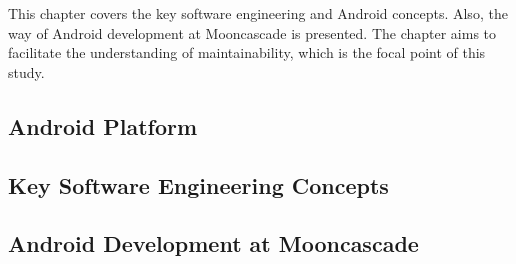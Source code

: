 This chapter covers the key software engineering and Android concepts. Also, the way of Android development at Mooncascade is presented. The chapter aims to facilitate the understanding of maintainability, which is the focal point of this study.

\subsection{Android Platform}


\subsection{Key Software Engineering Concepts}


\subsection{Android Development at Mooncascade}
\label{section:2.3}




